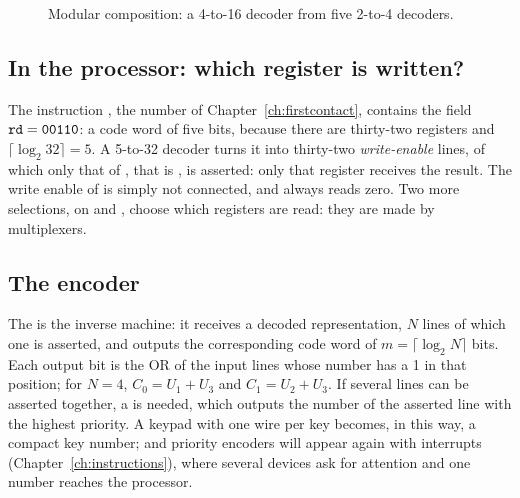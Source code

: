 \begin{figure}[htb]
\centering
{}
\caption{Modular composition: a 4-to-16 decoder from five 2-to-4 decoders.}
\label{fig:cm:dec16}
\end{figure}

\subsection{In the processor: which register is written?}

\begin{prgmachine}
The instruction , the number  of
Chapter~\ref{ch:firstcontact}, contains the field $\texttt{rd}=\texttt{00110}$:
a code word of five bits, because there are thirty-two registers and
$\lceil\log_2 32\rceil=5$. A 5-to-32 decoder turns it into thirty-two
\emph{write-enable} lines, of which only that of , that is ,
is asserted: only that register receives the result. The write enable of
 is simply not connected, and  always reads zero. Two more
selections, on  and , choose which registers are read:
they are made by multiplexers.
\end{prgmachine}

\subsection{The encoder}

The  is the inverse machine: it receives a decoded
representation, $N$ lines of which one is asserted, and outputs the
corresponding code word of $m=\lceil\log_2 N\rceil$ bits. Each output bit is
the OR of the input lines whose number has a 1 in that position; for $N=4$,
$C_0=U_1+U_3$ and $C_1=U_2+U_3$. If several lines can be asserted together, a
 is needed, which outputs the number of the asserted
line with the highest priority. A keypad with one wire per key becomes, in
this way, a compact key number; and priority encoders will appear again with
interrupts (Chapter~\ref{ch:instructions}), where several devices ask for
attention and one number reaches the processor.


